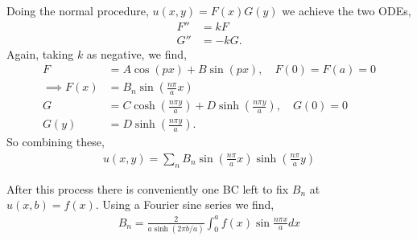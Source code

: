 \documentclass[11pt,a4paper]{report}
\theoremstyle{definition}
\begin{document}
Doing the normal procedure, $u(x,y) = F(x)G(y)$ we achieve the two ODEs,
\begin{align*}
	F'' &= kF \\
	G'' &= -kG.
\end{align*}
Again, taking $k$ as negative, we find,
\begin{align*}
	F &= A\cos(px) + B\sin(px), \quad F(0) = F(a) = 0 \\
	\implies F(x) &= B_n \sin\left(\frac{n\pi}{a}x\right) \\
	G &= C \cosh\left(\frac{n\pi y}{a}\right) + D\sinh\left(\frac{n\pi y}{a}\right), \quad G(0) = 0 \\
	G(y) &= D\sinh\left(\frac{n\pi y}{a}\right).
\end{align*}
So combining these,
\begin{align*}
	u(x,y) = \sum_n B_n \sin\left(\frac{n\pi}{a}x\right)\sinh\left(\frac{n\pi }{a}y\right)
\end{align*}

After this process there is conveniently one BC left to fix $B_n$ at $u(x,b)=f(x)$. Using a Fourier sine series we find,
\begin{align*}
	B_n = \frac{2}{a\sinh(2\pi b/a)} \int_0^a f(x) \sin\frac{n\pi x}{a} dx
\end{align*}
\end{document}
